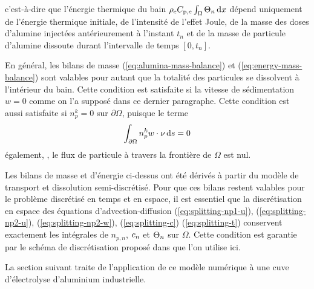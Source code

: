 c'est-à-dire que l'énergie thermique du bain
$\rho_\mathrm{e}C_{\mathrm{p,e}}\int_\Omega\Theta_{n}\,\mathrm dx$
dépend uniquement de l'énergie thermique initiale, de l'intensité de
l'effet Joule, de la masse des doses d'alumine injectées
antérieurement à l'instant $t_n$ et de la masse de particule d'alumine
dissoute durant l'intervalle de temps $[0, t_n]$.

\begin{remarque}
  En général, les bilans de masse (\ref{eq:alumina-mass-balance}) et
  (\ref{eq:energy-mass-balance}) sont valables pour autant que la
  totalité des particules se dissolvent à l'intérieur du bain. Cette
  condition est satisfaite si la vitesse de sédimentation $ w = 0$
  comme on l'a supposé dans ce dernier paragraphe. Cette condition est
  aussi satisfaite si $n_p^k = 0$ sur $\partial \Omega$, puisque le
  terme
  \begin{equation}
    \int_{\partial \Omega} n_p^k w\cdot \nu\,\mathrm ds = 0
  \end{equation}
  également, \ie, le flux de particule à travers la frontière de
  $\Omega$ est nul.
\end{remarque}

\begin{remarque}
  Les bilans de masse et d'énergie ci-dessus ont été dérivés à partir du
  modèle de transport et dissolution semi-discrétisé. Pour que ces
  bilans restent valables pour le problème discrétisé en temps et en
  espace, il est essentiel que la discrétisation en espace des équations
  d'advection-diffusion (\ref{eq:splitting-np1-u}),
  (\ref{eq:splitting-np2-u}), (\ref{eq:splitting-np2-w}),
  (\ref{eq:splitting-c}) (\ref{eq:splitting-t}) conservent exactement
  les intégrales de $n_{p,n}$, $c_n$ et
  $\Theta_n$ sur $\Omega$. Cette condition est garantie par le schéma de
  discrétisation proposé dans \cite{Flotron2013b} que l'on utilise ici.
\end{remarque}

La section suivant traite de l'application de ce modèle numérique à
une cuve d'électrolyse d'aluminium industrielle.

